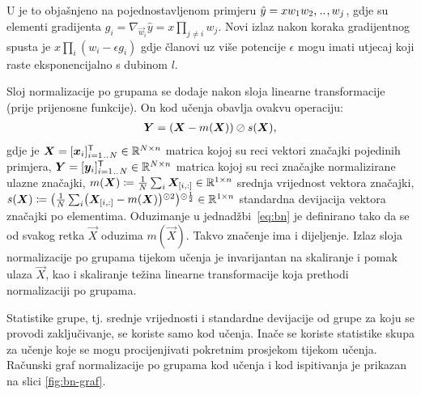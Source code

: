 \documentclass[utf8, diplomski, lmodern]{fer}
\begin{document}
U \cite{Goodfellow:2016:DL} je to objašnjeno na pojednostavljenom primjeru $\hat y=xw_1w_2,\bidot,w_j$, gdje su elementi gradijenta $g_i=\nabla_{\vec w_i}\hat y=x\prod_{j\neq i}w_j$. Novi izlaz nakon koraka gradijentnog spusta je $x\prod_i(w_i-\epsilon g_i)$ gdje članovi uz više potencije $\epsilon$ mogu imati utjecaj koji raste eksponencijalno s dubinom $l$.

Sloj normalizacije po grupama se dodaje nakon sloja linearne transformacije (prije prijenosne funkcije). On kod učenja obavlja ovakvu operaciju:
\begin{align} \label{eq:bn}
	\vec Y = \del{\vec X-m(\vec X)}\oslash s(\vec X) \text{,}
\end{align}
gdje je $\vec X=\sbr{\vec x_i}_{i=1\bidot N}^\tp\in\R^{N\times n}$ matrica kojoj su reci vektori značajki pojedinih primjera, $\vec Y=\sbr{\vec y_i}_{i=1\bidot N}^\tp\in\R^{N\times n}$ matrica kojoj su reci značajke normalizirane ulazne značajki, $m(\vec X)\coloneqq\frac{1}{N}\sum_i\vec X_\ind{i,:}\in\R^{1\times n}$ srednja vrijednost vektora značajki, $s(\vec X)\coloneqq\del{\frac{1}{N}\sum_i\del{\vec X_\ind{i,:}-m(\vec X)}^{\odot 2}}^{\odot\frac{1}{2}}\in\R^{1\times n}$ standardna devijacija vektora značajki po elementima. Oduzimanje u jednadžbi~\eqref{eq:bn} je definirano tako da se od svakog retka $\vec X$ oduzima $m(\vec X)$. Takvo značenje ima i dijeljenje. Izlaz sloja normalizacije po grupama tijekom učenja je invarijantan na skaliranje i pomak ulaza $\vec X$, kao i skaliranje težina linearne transformacije koja prethodi normalizaciji po grupama.

Statistike grupe, tj. srednje vrijednosti i standardne devijacije od grupe za koju se provodi zaključivanje, se koriste samo kod učenja. Inače se koriste statistike skupa za učenje koje se mogu procijenjivati pokretnim prosjekom tijekom učenja. Računski graf normalizacije po grupama kod učenja i kod ispitivanja je prikazan na slici \ref{fig:bn-graf}.
\end{document}
